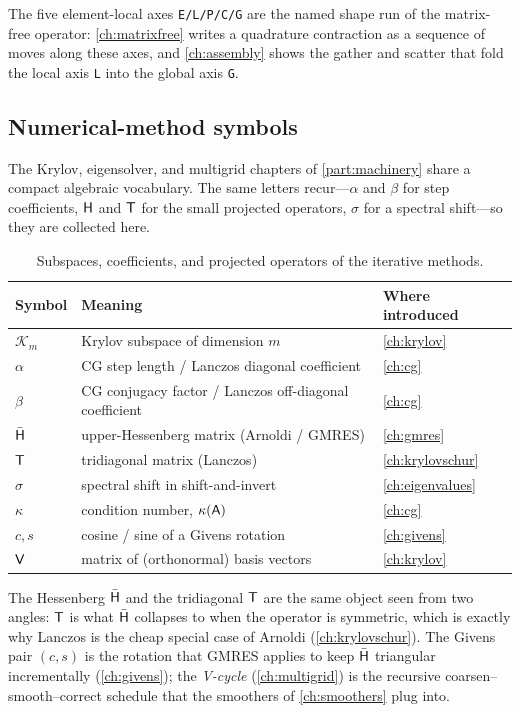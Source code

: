 The five element-local axes \texttt{E/L/P/C/G} are the named shape run of the
matrix-free operator: \cref{ch:matrixfree} writes a quadrature contraction as a
sequence of moves along these axes, and \cref{ch:assembly} shows the gather and
scatter that fold the local axis \texttt{L} into the global axis \texttt{G}.

\subsection{Numerical-method symbols}

The Krylov, eigensolver, and multigrid chapters of \cref{part:machinery} share a
compact algebraic vocabulary. The same letters recur---$\alpha$ and $\beta$ for
step coefficients, $\mathsf{H}$ and $\mathsf{T}$ for the small projected operators,
$\sigma$ for a spectral shift---so they are collected here.

\begin{table}[ht]
\centering
\small
\caption[Krylov and eigensolver symbols]{Subspaces, coefficients, and projected
operators of the iterative methods.}
\label{tab:gl-numerics}
\begin{tabular}{@{}lll@{}}
\toprule
Symbol & Meaning & Where introduced \\
\midrule
$\mathcal{K}_m$ & Krylov subspace of dimension $m$ & \cref{ch:krylov} \\
$\alpha$ & CG step length / Lanczos diagonal coefficient & \cref{ch:cg} \\
$\beta$ & CG conjugacy factor / Lanczos off-diagonal coefficient & \cref{ch:cg} \\
$\bar{\mathsf{H}}$ & upper-Hessenberg matrix (Arnoldi / GMRES) & \cref{ch:gmres} \\
$\mathsf{T}$ & tridiagonal matrix (Lanczos) & \cref{ch:krylovschur} \\
$\sigma$ & spectral shift in shift-and-invert & \cref{ch:eigenvalues} \\
$\kappa$ & condition number, $\kappa(\mathsf{A})$ & \cref{ch:cg} \\
$c,s$ & cosine / sine of a Givens rotation & \cref{ch:givens} \\
$\mathsf{V}$ & matrix of (orthonormal) basis vectors & \cref{ch:krylov} \\
\bottomrule
\end{tabular}
\end{table}

The Hessenberg $\bar{\mathsf{H}}$ and the tridiagonal $\mathsf{T}$ are the same object
seen from two angles: $\mathsf{T}$ is what $\bar{\mathsf{H}}$ collapses to when the
operator is symmetric, which is exactly why Lanczos is the cheap special case of
Arnoldi (\cref{ch:krylovschur}). The Givens pair $(c,s)$ is the rotation that
GMRES applies to keep $\bar{\mathsf{H}}$ triangular incrementally
(\cref{ch:givens}); the \emph{V-cycle} (\cref{ch:multigrid}) is the recursive
coarsen--smooth--correct schedule that the smoothers of \cref{ch:smoothers}
plug into.

